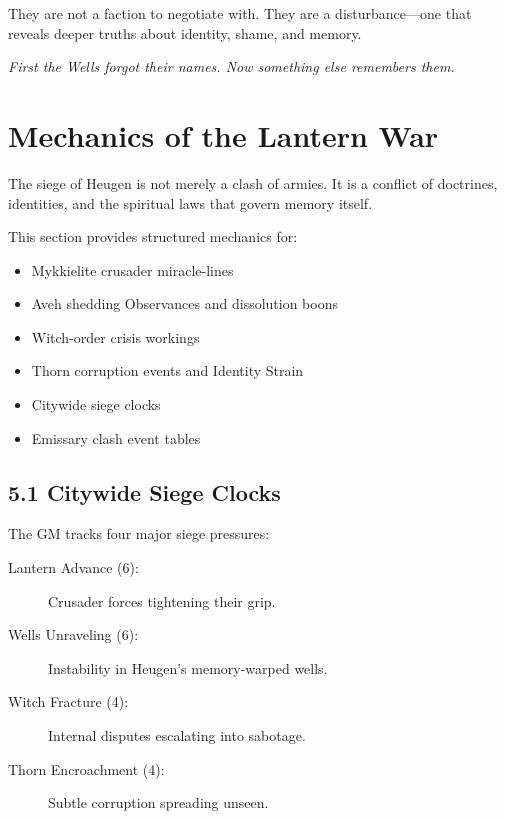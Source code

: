 \documentclass[11pt]{book}
\begin{document}
They are not a faction to negotiate with.  
They are a disturbance---one that reveals deeper truths about identity, shame, and memory.

\begin{center}
\emph{First the Wells forgot their names.  
Now something else remembers them.}
\end{center}

\section{Mechanics of the Lantern War}

The siege of Heugen is not merely a clash of armies.  
It is a conflict of doctrines, identities, and the spiritual laws that govern memory itself.

This section provides structured mechanics for:
\begin{itemize}[leftmargin=*]
    \item Mykkielite crusader miracle-lines
    \item Aveh shedding Observances and dissolution boons
    \item Witch-order crisis workings
    \item Thorn corruption events and Identity Strain
    \item Citywide siege clocks
    \item Emissary clash event tables
\end{itemize}

\subsection{5.1 Citywide Siege Clocks}

The GM tracks four major siege pressures:

\begin{description}
    \item[Lantern Advance (6):] Crusader forces tightening their grip.
    \item[Wells Unraveling (6):] Instability in Heugen's memory-warped wells.
    \item[Witch Fracture (4):] Internal disputes escalating into sabotage.
    \item[Thorn Encroachment (4):] Subtle corruption spreading unseen.
\end{description}
\end{document}
